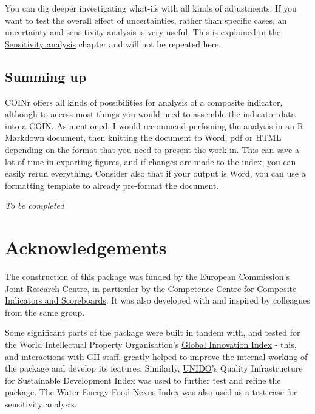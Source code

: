 \documentclass[
]{book}
\begin{document}
You can dig deeper investigating what-ifs with all kinds of adjustments. If you want to test the overall effect of uncertainties, rather than specific cases, an uncertainty and sensitivity analysis is very useful. This is explained in the \protect\hyperlink{sensitivity-analysis}{Sensitivity analysis} chapter and will not be repeated here.

\hypertarget{summing-up}{%
\section{Summing up}\label{summing-up}}

COINr offers all kinds of possibilities for analysis of a composite indicator, although to access most things you would need to assemble the indicator data into a COIN. As mentioned, I would recommend perfoming the analysis in an R Markdown document, then knitting the document to Word, pdf or HTML depending on the format that you need to present the work in. This can save a lot of time in exporting figures, and if changes are made to the index, you can easily rerun everything. Consider also that if your output is Word, you can use a formatting template to already pre-format the document.

\emph{To be completed}

\hypertarget{acknowledgements}{%
\chapter{Acknowledgements}\label{acknowledgements}}

The construction of this package was funded by the European Commission's Joint Research Centre, in particular by the \href{https://composite-indicators.jrc.ec.europa.eu/}{Competence Centre for Composite Indicators and Scoreboards}. It was also developed with and inspired by colleagues from the same group.

Some significant parts of the package were built in tandem with, and tested for the World Intellectual Property Organisation's \href{https://www.globalinnovationindex.org/Home}{Global Innovation Index} - this, and interactions with GII staff, greatly helped to improve the internal working of the package and develop its features. Similarly, \href{https://www.unido.org/}{UNIDO}'s Quality Infrastructure for Sustainable Development Index was used to further test and refine the package. The \href{https://wefnexusindex.org/}{Water-Energy-Food Nexus Index} was also used as a test case for sensitivity analysis.
\end{document}
